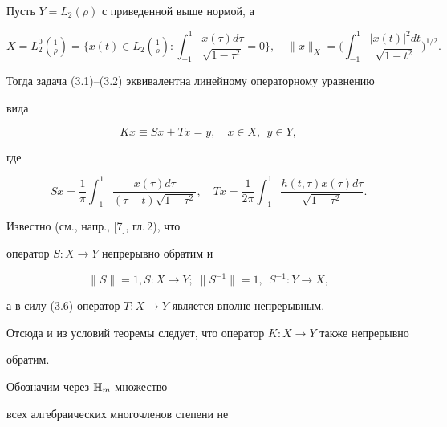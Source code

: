 \begin{pf}


Пусть $Y=L_2(\rho)$ с приведенной выше нормой, а


$$


X=L_2^0(\tfrac{1}{\rho})=\bigg\{


x(t)\in L_2(\tfrac{1}{\rho}):


\int_{-1}^{1}\frac{x(\tau)d\tau}{\sqrt{1-\tau^2}}=0


\bigg\},\quad


\|x\|_X=\bigg(


\int_{-1}^{1}\frac{|x(t)|^2dt}{\sqrt{1-t^2}}


\bigg)^{1/2}.


$$


Тогда задача (3.1)--(3.2) эквивалентна линейному операторному уравнению


вида


\begin{equation}


Kx\equiv Sx+Tx=y,\quad x\in X, \ \ y\in Y,


\end{equation}


где


$$


Sx=\frac{1}{\pi}\int_{-1}^{1}\frac{x(\tau)d\tau}{(\tau-t)\sqrt{1-\tau^2}},


\quad Tx=\frac{1}{2\pi}\int_{-1}^{1}


\frac{h(t,\tau)x(\tau)d\tau}{\sqrt{1-\tau^2}}.


$$


Известно (см., напр., [7], гл.\,2), что


оператор $S:X\to Y$ непрерывно обратим и


\begin{equation}


\|S\|=1, S:X\to Y;\; \|S^{-1}\|=1,\ \ S^{-1}:Y\to X,


\end{equation}


а в силу (3.6) оператор $T:X\to Y$ является вполне непрерывным.


Отсюда и из условий теоремы следует, что оператор $K:X\to Y$ также непрерывно


обратим.





Обозначим через $\Bbb H_m$ множество 


всех алгебраических многочленов степени не



\end{pf}
